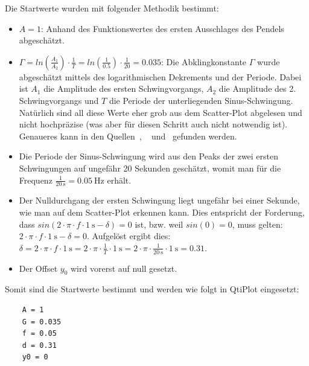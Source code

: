 Die Startwerte wurden mit folgender Methodik bestimmt:
\begin{itemize}
    \item
        $A = 1$: Anhand des Funktionswertes des ersten Ausschlages des Pendels
        abgesch\"atzt.
    \item
        $\Gamma  =  ln  \left(\frac{A_1}{A_2}   \right)  \cdot  \frac{1}{T}  =
        ln  \left(\frac{1}{0.5}   \right)  \cdot   \frac{1}{20}  =   0.035  $:
        Die   Abklingkonstante  $\Gamma$   wurde  abgesch\"atzt   mittels  des
        logarithmischen   Dekrements   und   der  Periode. Dabei   ist   $A_1$
        die  Amplitude   des  ersten  Schwingvorgangs,  $A_2$   die  Amplitude
        des  2. Schwingvorgangs   und  $T$  die  Periode   der  unterliegenden
        Sinus-Schwingung. Nat\"urlich   sind  all   diese   Werte  eher   grob
        aus   dem  Scatter-Plot   abgelesen  und   nicht  hochpr\"azise   (was
        aber  f\"ur  diesen  Schritt   auch  nicht  notwendig  ist). Genaueres
        kann     in     den     Quellen~\cite{ref:wikipedia:abklingkonstante},
        ~\cite{ref:wikipedia:periode}   und~\cite{ref:wikipedia:logarithmDekr}
        gefunden werden.
    \item
        Die Periode  der Sinus-Schwingung wird  aus den Peaks der  zwei ersten
        Schwingungen  auf  ungef\"ahr  20   Sekunden  gesch\"atzt,  womit  man
        f\"ur  die Frequenz  $\frac{1}{\SI{20}{\second}} =  \SI{0.05}{\hertz}$
        erh\"alt.
    \item
        Der  Nulldurchgang der  ersten Schwingung  liegt ungef\"ahr  bei einer
        Sekunde, wie  man auf dem Scatter-Plot  erkennen kann. Dies entspricht
        der Forderung, dass  $sin(2 \cdot \pi \cdot f  \cdot \SI{1}{\second} -
        \delta) = 0$ ist,  bzw. weil $sin(0) = 0$, muss  gelten:  $2 \cdot \pi
        \cdot f \cdot \SI{1}{\second} -  \delta = 0$. Aufgel\"ost ergibt dies:
        $\delta  =  2 \cdot  \pi  \cdot  f  \cdot  \SI{1}{\second} =  2  \cdot
        \pi  \cdot  \frac{1}{T} \cdot  \SI{1}{\second}  =  2 \cdot  \pi  \cdot
        \frac{1}{\SI{20}{\second}} \cdot \SI{1}{\second} = 0.31$.
    \item
        Der Offset $y_0$ wird vorerst auf null gesetzt.
\end{itemize}

Somit sind die Startwerte bestimmt und werden wie folgt in QtiPlot eingesetzt:
\begin{verbatim}
    A = 1
    G = 0.035
    f = 0.05
    d = 0.31
    y0 = 0
\end{verbatim}

